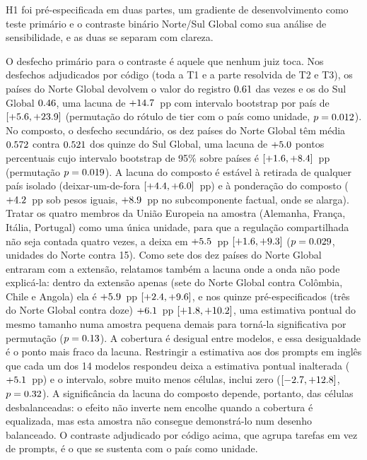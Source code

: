 H1 foi pré-especificada em duas partes, um gradiente de desenvolvimento como
teste primário e o contraste binário Norte/Sul Global como sua análise de
sensibilidade, e as duas se separam com clareza.

O desfecho primário para o contraste é aquele que nenhum juiz toca. Nos
desfechos adjudicados por código (toda a T1 e a parte resolvida de T2 e T3),
os países do Norte Global devolvem o valor do registro $0.61$ das vezes e
os do Sul Global $0.46$, uma lacuna de $+14.7$~pp com intervalo
bootstrap por país de $[+5.6,+23.9]$ (permutação do rótulo de tier com o país
como unidade, $p=0.012$). No composto, o desfecho secundário, os dez países do Norte Global
têm média $0.572$ contra $0.521$ dos quinze do Sul Global, uma lacuna de
$+5.0$ pontos percentuais cujo intervalo bootstrap de 95\% sobre países é
$[+1.6,+8.4]$~pp (permutação $p=0.019$). A lacuna do composto é estável
à retirada de qualquer país isolado (deixar-um-de-fora
$[+4.4,+6.0]$~pp) e à ponderação do composto ($+4.2$~pp
sob pesos iguais, $+8.9$~pp no subcomponente factual, onde se alarga).
Tratar os quatro membros da União Europeia na amostra (Alemanha, França,
Itália, Portugal) como uma única unidade, para que a regulação compartilhada
não seja contada quatro vezes, a deixa em $+5.5$~pp $[+1.6,+9.3]$
($p=0.029$, \ngapeuunits{} unidades do Norte contra 15). Como sete dos dez
países do Norte Global entraram com a extensão, relatamos também a lacuna onde
a onda não pode explicá-la: dentro da extensão apenas (sete do Norte Global
contra Colômbia, Chile e Angola) ela é $+5.9$~pp $[+2.4,+9.6]$, e
nos quinze pré-especificados (três do Norte Global contra doze)
$+6.1$~pp $[+1.8,+10.2]$, uma estimativa pontual do mesmo tamanho
numa amostra pequena demais para torná-la significativa por permutação
($p=0.13$). A cobertura é desigual entre modelos, e essa desigualdade é o ponto mais fraco
da lacuna. Restringir a estimativa aos \ngapbalprompts{} dos \ngapbaltotal{}
prompts em inglês que cada um dos 14 modelos respondeu deixa a estimativa
pontual inalterada ($+5.1$~pp) e o intervalo, sobre muito menos células,
inclui zero ($[-2.7,+12.8]$, $p=0.32$). A significância da lacuna do
composto depende, portanto, das células desbalanceadas: o efeito não inverte nem
encolhe quando a cobertura é equalizada, mas esta amostra não consegue
demonstrá-lo num desenho balanceado. O contraste adjudicado por código acima,
que agrupa tarefas em vez de prompts, é o que se sustenta com o país como
unidade.

